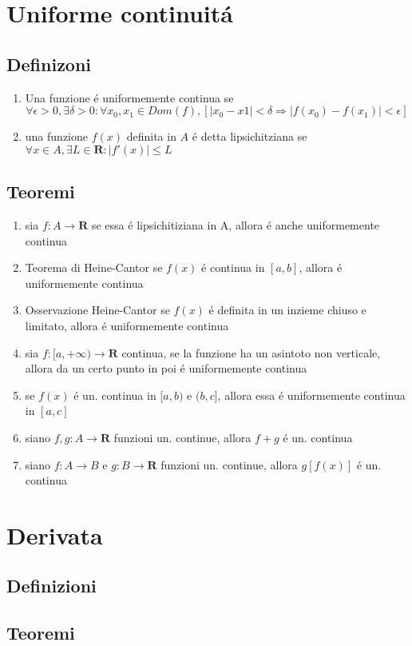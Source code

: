 \documentclass{exam}
\begin{document}
\section{Uniforme continuit\'a}
  \subsection{Definizoni}
    \begin{enumerate}
      \item
        Una funzione \'e uniformemente continua se
        \begin{equation}
         \forall \epsilon >0, \exists \delta >0 : \forall x_{0},x_{1} \in Dom(f),[|x_{0}-x{1}|<\delta \Rightarrow |f(x_{0})-f(x_{1})|<\epsilon]
        \end{equation}
      \item
       una funzione $f(x)$ definita in $A$ \'e detta lipsichitziana se $ \forall x\in A,\exists L\in \mathbf{R}:|f'(x)|\le L$
  \end{enumerate}


  \subsection{Teoremi}
    \begin{enumerate}
      \item
        sia $f:A\rightarrow \mathbf{R}$ se essa \'e lipsichitiziana in A, allora \'e anche uniformemente continua
      \item{Teorema di Heine-Cantor}
        se $f(x)$ \'e continua in $[a,b]$, allora \'e uniformemente continua
      \item{Osservazione Heine-Cantor}
        se $f(x)$ \'e definita in un inzieme chiuso e limitato, allora \'e uniformemente continua
      \item
        sia $f:[a,+\infty)\rightarrow \mathbf{R}$ continua, se la funzione ha un asintoto non verticale, allora da un certo punto in poi \'e uniformemente continua
      \item
        se $f(x)$ \'e un. continua in $[a,b)$ e $(b,c]$, allora essa \'e uniformemente continua in $[a,c]$
      \item
        siano $f,g:A\rightarrow \mathbf{R}$ funzioni un. continue, allora $f+g$ \'e un. continua
      \item
        siano $f:A\rightarrow B$ e $g:B\rightarrow \mathbf{R}$ funzioni un. continue, allora $g[f(x)]$ \'e un. continua
    \end{enumerate}    
  \newpage






\section{Derivata}
  \subsection{Definizioni}


  \subsection{Teoremi}
\end{document}

